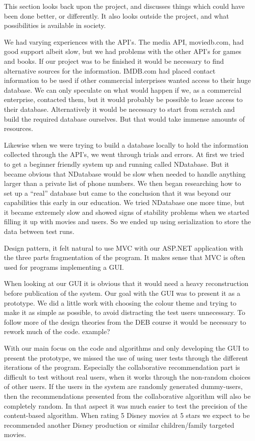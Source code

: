 This section looks back upon the project, and discusses things which could have been done better, or differently. It also looks outside the project, and what possibilities is available in society.

We had varying experiences with the API’s. The media API, moviedb.com, had good support albeit slow, but we had problems with the other API’s for games and books. If our project was to be finished it would be necessary to find alternative sources for the information. IMDB.com had placed contact information to be used if other commercial interprises wanted access to their huge database. We can only speculate on what would happen if we, as a commercial enterprise, contacted them, but it would probably be possible to lease access to their database. Alternatively it would be necessary to start from scratch and build the required database ourselves. But that would take immense amounts of resources.

Likewise when we were trying to build a database locally to hold the information collected through the API’s, we went through trials and errors. At first we tried to get a beginner friendly system up and running called NDatabase. But it became obvious that NDatabase would be slow when needed to handle anything larger than a private list of phone numbers. We then began researching how to set up a “real” database but came to the conclusion that it was beyond our capabilities this early in our education. We tried NDatabase one more time, but it became extremely slow and showed signs of stability problems when we started filling it up with movies and users. So we ended up using serialization to store the data between test runs.

Design pattern, it felt natural to use MVC with our ASP.NET application with the three parts fragmentation of the program. It makes sense that MVC is often used for programs implementing a GUI.       

When looking at our GUI it is obvious that it would need a heavy reconstruction before publication of the system. Our goal with the GUI was to present it as a prototype. We did a little work with choosing the colour theme and trying to make it as simple as possible, to avoid distracting the test users unnecessary. To follow more of the design theories from the DEB course it would be necessary to rework much of the code. example?  

With our main focus on the code and algorithms and only developing the GUI to present the prototype, we missed the use of using user tests through the different iterations of the program. Especially the collaborative recommendation part is difficult to test without real users, when it works through the non-random choices of other users. If the users in the system are randomly generated dummy-users, then the recommendations presented from the collaborative algorithm will also be completely random. In that aspect it was much easier to test the precision of the content-based algorithm. When rating 5 Disney movies at 5 stars we expect to be recommended another Disney production or similar children/family targeted movies.

